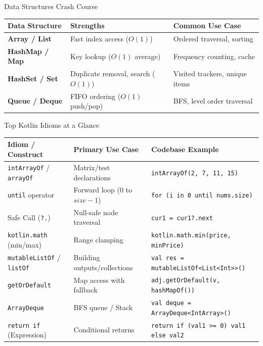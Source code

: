 \begin{frame}{Data Structures Crash Course}
  \begin{table}[]
    \scriptsize
    \begin{tabular}{lll}
        \toprule
        \textbf{Data Structure} & \textbf{Strengths} & \textbf{Common Use Case} \\ \midrule
        \textbf{Array / List} & Fast index access ($O(1)$) & Ordered traversal, sorting \\
        \textbf{HashMap / Map} & Key lookup ($O(1)$ average) & Frequency counting, cache \\
        \textbf{HashSet / Set} & Duplicate removal, search ($O(1)$) & Visited trackers, unique items \\
        \textbf{Queue / Deque} & FIFO ordering ($O(1)$ push/pop) & BFS, level order traversal \\
        \bottomrule
    \end{tabular}
  \end{table}
\end{frame}

\begin{frame}[fragile]{Top Kotlin Idioms at a Glance}
  \tiny
  \centering
  \begin{table}[]
    \begin{tabular}{lll}
        \toprule
        \textbf{Idiom / Construct} & \textbf{Primary Use Case} & \textbf{Codebase Example} \\ \midrule
        \texttt{intArrayOf} / \texttt{arrayOf} & Matrix/test declarations & \texttt{intArrayOf(2, 7, 11, 15)} \\
        \texttt{until} operator & Forward loop ($0$ to $size-1$) & \texttt{for (i in 0 until nums.size)} \\
        Safe Call (\texttt{?.}) & Null-safe node traversal & \texttt{cur1 = cur1?.next} \\
        \texttt{kotlin.math} (min/max) & Range clamping & \texttt{kotlin.math.min(price, minPrice)} \\
        \texttt{mutableListOf} / \texttt{listOf} & Building outputs/collections & \texttt{val res = mutableListOf<List<Int>>()} \\
        \texttt{getOrDefault} & Map access with fallback & \texttt{adj.getOrDefault(v, hashMapOf())} \\
        \texttt{ArrayDeque} & BFS queue / Stack & \texttt{val deque = ArrayDeque<IntArray>()} \\
        \texttt{return if} (Expression) & Conditional returns & \texttt{return if (val1 >= 0) val1 else val2} \\
        \bottomrule
    \end{tabular}
  \end{table}
\end{frame}
